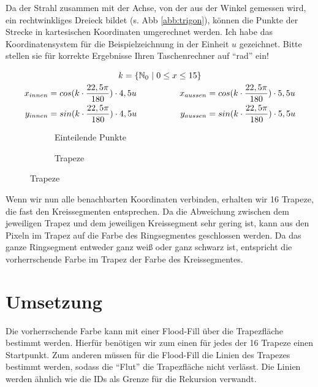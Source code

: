 	Da der Strahl zusammen mit der Achse, von der aus der Winkel gemessen wird, ein rechtwinkliges Dreieck bildet (s. Abb \ref{abb:trigon}), können die Punkte der Strecke in kartesischen Koordinaten umgerechnet werden. Ich habe das Koordinatensystem für die Beispielzeichnung in der Einheit \(u\) gezeichnet. Bitte stellen sie für korrekte Ergebnisse Ihren Taschenrechner auf "`rad"' ein!

	\begin{gather}
	k = \{\mathbb{N}_0 \hspace{0.3em}|\hspace{0.3em} 0 \le x \le 15\} \\
	\begin{split}
	x_{innen} &= cos(k \cdot \frac{22,5\pi}{180}) \cdot 4,5u \\
	y_{innen} &= sin(k \cdot \frac{22,5\pi}{180}) \cdot 4,5u
	\end{split}
	\hspace{5em}
	\begin{split}
	x_{aussen} &= cos(k \cdot \frac{22,5\pi}{180}) \cdot 5,5u \\
	y_{aussen} &= sin(k \cdot \frac{22,5\pi}{180}) \cdot 5,5u
	\end{split}
	\end{gather}

	\begin{figure}[!ht]
		\begin{subfigure}[b]{0.5\textwidth}
			\centering	
			
			\caption{Einteilende Punkte}
		\end{subfigure}
		\begin{subfigure}[b]{0.5\textwidth}
			\centering	
			
			\caption{Trapeze}
		\end{subfigure}
	\end{figure}

	Wenn wir nun alle benachbarten Koordinaten verbinden, erhalten wir 16 Trapeze, die fast den Kreissegmenten entsprechen. Da die Abweichung zwischen dem jeweiligen Trapez und dem jeweiligen Kreissegment sehr gering ist, kann aus den Pixeln im Trapez auf die Farbe des Ringsegmentes geschlossen werden. Da das ganze Ringsegment entweder ganz weiß oder ganz schwarz ist, entspricht die vorherrschende Farbe im Trapez der Farbe des Kreissegmentes.
\section{Umsetzung}
	Die vorherrschende Farbe kann mit einer Flood-Fill über die Trapezfläche bestimmt werden. Hierfür benötigen wir zum einen für jedes der 16 Trapeze einen Startpunkt. Zum anderen müssen für die Flood-Fill die Linien des Trapezes bestimmt werden, sodass die "`Flut"' die Trapezfläche nicht verlässt. Die Linien werden ähnlich wie die IDs als Grenze für die Rekursion verwandt.


